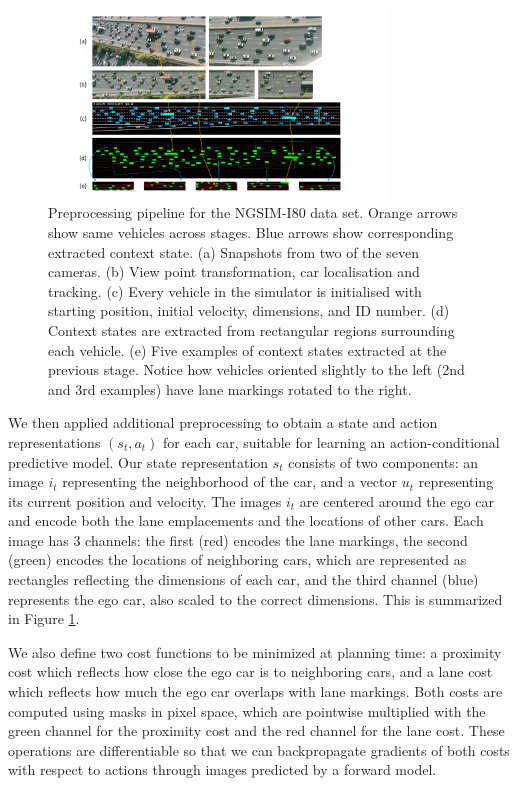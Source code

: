 \documentclass{article} %
\begin{document}
\begin{figure}[t]
  \centering
  \includegraphics[width=0.8\textwidth]{figures/driving/I-80.pdf}
  \caption{
    Preprocessing pipeline for the NGSIM-I80 data set.
    Orange arrows show same vehicles across stages.
    Blue arrows show corresponding extracted context state.
    (a) Snapshots from two of the seven cameras.
    (b) View point transformation, car localisation and tracking.
    (c) Every vehicle in the simulator is initialised with starting position, initial velocity, dimensions, and ID number.
    (d) Context states are extracted from rectangular regions surrounding each vehicle.
    (e) Five examples of context states extracted at the previous stage.
    Notice how vehicles oriented slightly to the left (2nd and 3rd examples) have lane markings rotated to the right.
  }
\label{I-80}
\end{figure}


We then applied additional preprocessing to obtain a state and action representations $(s_t, a_t)$ for each car, suitable for learning an action-conditional predictive model.
Our state representation $s_t$ consists of two components: an image $i_t$ representing the neighborhood of the car, and a vector $u_t$ representing its current position and velocity.
The images $i_t$ are centered around the ego car and encode both the lane emplacements and the locations of other cars.
Each image has 3 channels: the first (red) encodes the lane markings, the second (green) encodes the locations of neighboring cars, which are represented as rectangles reflecting the dimensions of each car, and the third channel (blue) represents the ego car, also scaled to the correct dimensions.
This is summarized in Figure \ref{I-80}.


We also define two cost functions to be minimized at planning time: a proximity cost which reflects how close the ego car is to neighboring cars, and a lane cost which reflects how much the ego car overlaps with lane markings.
Both costs are computed using masks in pixel space, which are pointwise multiplied with the green channel for the proximity cost and the red channel for the lane cost.
These operations are differentiable so that we can backpropagate gradients of both costs with respect to actions through images predicted by a forward model.
\end{document}
